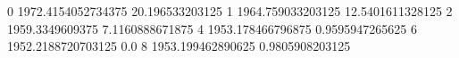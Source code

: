 0 1972.4154052734375 20.196533203125
1 1964.759033203125 12.5401611328125
2 1959.3349609375 7.1160888671875
4 1953.178466796875 0.9595947265625
6 1952.2188720703125 0.0
8 1953.199462890625 0.9805908203125
